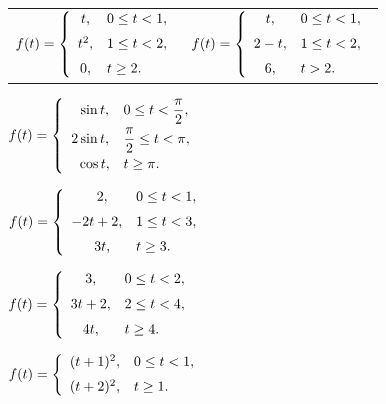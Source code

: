 \begin{exerciselist}
  \begin{tabular}[t]{@{}p{168pt}@{}p{168pt}}
    \item\label{exer:8.4.13} $\displaystyle{f(t)=\left\{\begin{array}{cl}t,&0\le t<1,\\[2\jot]t^{2},&1\le t<2,\\[2\jot]0,&t\ge2.\end{array}\right.}$ &
    \item\label{exer:8.4.14} $\displaystyle{f(t)=\left\{\begin{array}{cl}t,&0\le t<1,\\[2\jot]2-t,&1\le t<2,\\[2\jot]6,&t>2.\end{array}\right.}$
  \end{tabular}

  \item\label{exer:8.4.15} \CGex $\displaystyle{f(t)=\left\{\begin{array}{cl}\phantom{2} \sin t,&0\le t<\displaystyle\frac{\pi}{2},\\[2\jot]2\sin t,& \displaystyle\frac{\pi}{2}\le t<\pi,\\[2\jot]\phantom{2}\cos t, &t\ge\pi.\end{array}\right.}$

  \item\label{exer:8.4.16} \CGex $f(t)=\displaystyle{\left\{\begin{array}{cl}\phantom{-}2,&0\le t<1,\\[2\jot]-2t+2,&1\le t<3,\\[2\jot]\phantom{-}3t,&t\ge 3.\end{array}\right.}$

  \item\label{exer:8.4.17} \CGex $f(t)=\displaystyle{\left\{\begin{array}{cl}3,&0\le t<2,\\[2\jot]3t+2,&2\le t<4,\\[2\jot]4t,&t\ge 4.\end{array}\right.}$

  \item\label{exer:8.4.18} \CGex $\displaystyle{f(t)=\left\{\begin{array}{ll}(t+1)^{2},&0\le t<1, \\[2\jot](t+2)^{2},&t\ge1.\end{array}\right.}$



\end{exerciselist}
